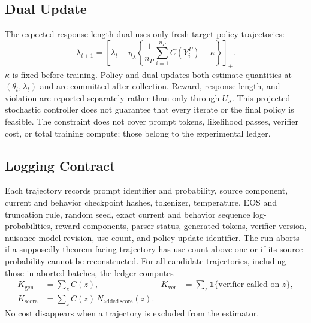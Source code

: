 \documentclass{article}
\begin{document}
\subsection{Dual Update}
The expected-response-length dual uses only fresh target-policy trajectories:
\begin{equation}
\lambda_{t+1}=
\left[\lambda_t+\eta_\lambda
\left\{\frac1{n_P}\sum_{i=1}^{n_P}C(Y_i^P)-\kappa\right\}\right]_+.
\end{equation}
$\kappa$ is fixed before training. Policy and dual updates both estimate
quantities at $(\theta_t,\lambda_t)$ and are committed after collection.
Reward, response length, and violation are reported separately rather than
only through $U_\lambda$. This projected stochastic controller does not
guarantee that every iterate or the final policy is feasible. The constraint
does not cover prompt tokens,
likelihood passes, verifier cost, or total training compute; those belong to
the experimental ledger.

\subsection{Logging Contract}
Each trajectory records prompt identifier and probability, source component,
current and behavior checkpoint hashes, tokenizer, temperature, EOS and
truncation rule, random seed, exact current and behavior sequence
log-probabilities, reward components, parser status, generated tokens, verifier
version, nuisance-model revision, use count, and policy-update identifier. The
run aborts if a supposedly theorem-facing trajectory has use count above one
or if its source probability cannot be reconstructed.
For all candidate trajectories, including those in aborted batches, the
ledger computes
\begin{align}
K_{\mathrm{gen}}&=\sum_z C(z),&
K_{\mathrm{ver}}&=\sum_z\mathbf 1\{\text{verifier called on }z\},\\
K_{\mathrm{score}}&=\sum_z C(z)\,N_{\mathrm{added\ score}}(z).
\end{align}
No cost disappears when a trajectory is excluded from the estimator.
\end{document}
